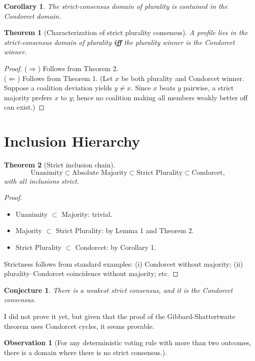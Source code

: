 \documentclass{article}
\newtheorem{theorem}{Theorem}
\newtheorem{corollary}{Corollary}
\newtheorem{conjecture}{Conjecture}
\newtheorem{observation}{Observation}
\begin{document}
\begin{corollary}
The strict-consensus domain of plurality is contained in the Condorcet domain.
\end{corollary}

\begin{theorem}[Characterization of strict plurality consensus]
A profile lies in the strict-consensus domain of plurality \textbf{iff} the plurality winner is the Condorcet winner.
\end{theorem}
\begin{proof}
($\Rightarrow$) Follows from Theorem 2. \\
($\Leftarrow$) Follows from Theorem 1. (Let $x$ be both plurality and Condorcet winner. Suppose a coalition deviation yields $y\neq x$. Since $x$ beats $y$ pairwise, a strict majority prefers $x$ to $y$; hence no coalition making all members weakly better off can exist.)
\end{proof}

\section{Inclusion Hierarchy}
\begin{theorem}[Strict inclusion chain]
\[
\text{Unanimity} \subset \text{Absolute Majority} \subset \text{Strict Plurality} \subset \text{Condorcet},
\]
with all inclusions strict.
\end{theorem}
\begin{proof}
\begin{itemize}
    \item Unanimity $\subset$ Majority: trivial.
    \item Majority $\subset$ Strict Plurality: by Lemma 1 and Theorem 2.
    \item Strict Plurality $\subset$ Condorcet: by Corollary 1.
\end{itemize}
Strictness follows from standard examples: (i) Condorcet without majority; (ii) plurality–Condorcet coincidence without majority; etc.
\end{proof}

\begin{conjecture}
There is a weakest strict consensus, and it is the Condorcet consensus.
\end{conjecture}

I did not prove it yet, but given that the proof of the Gibbard-Shattertwaite theorem uses Condorcet cycles, it seems provable.


\begin{observation}[For any deterministic voting rule with more than two outcomes, there is a domain where there is no strict consensus.]
\end{observation} 
\end{document}
